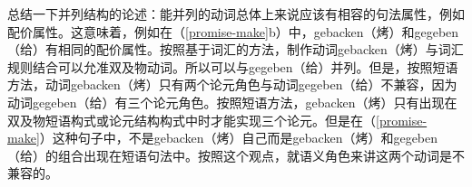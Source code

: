     总结一下并列结构的论述：能并列的动词总体上来说应该有相容的句法属性，例如配价属性。这意味着，例如在（\ref{promise-make}b）中，gebacken（烤）和gegeben（给）有相同的配价属性。按照基于词汇的方法，制作动词gebacken（烤）与词汇规则结合可以允准双及物动词。所以可以与gegeben（给）并列。但是，按照短语方法，动词gebacken（烤）只有两个论元角色与动词gegeben（给）不兼容，因为动词gegeben（给）有三个论元角色。按照短语方法，gebacken（烤）只有出现在双及物短语构式或论元结构构式中时才能实现三个论元。但是在（\ref{promise-make}）这种句子中，不是gebacken（烤）自己而是gebacken（烤）和gegeben（给）的组合出现在短语句法中。按照这个观点，就语义角色来讲这两个动词是不兼容的。

